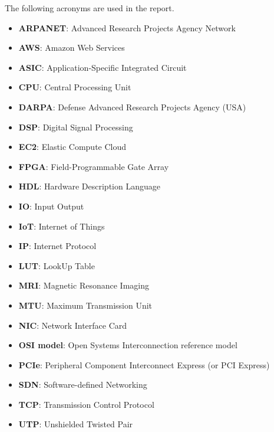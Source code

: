 The following acronyms are used in the report.
\begin{itemize}
  \item \textbf{ARPANET}: Advanced Research Projects Agency Network
  \item \textbf{AWS}: Amazon Web Services
  \item \textbf{ASIC}: Application-Specific Integrated Circuit
  \item \textbf{CPU}: Central Processing Unit
  \item \textbf{DARPA}: Defense Advanced Research Projects Agency (USA)
  \item \textbf{DSP}: Digital Signal Processing
  \item \textbf{EC2}: Elastic Compute Cloud
  \item \textbf{FPGA}: Field-Programmable Gate Array
  \item \textbf{HDL}: Hardware Description Language
  \item \textbf{IO}: Input Output
  \item \textbf{IoT}: Internet of Things
  \item \textbf{IP}: Internet Protocol
  \item \textbf{LUT}: LookUp Table
  \item \textbf{MRI}: Magnetic Resonance Imaging
  \item \textbf{MTU}: Maximum Transmission Unit
  \item \textbf{NIC}: Network Interface Card
  \item \textbf{OSI model}: Open Systems Interconnection reference model
  \item \textbf{PCIe}: Peripheral Component Interconnect Express (or PCI Express)
  \item \textbf{SDN}: Software-defined Networking
  \item \textbf{TCP}: Transmission Control Protocol
  \item \textbf{UTP}: Unshielded Twisted Pair
\end{itemize}
